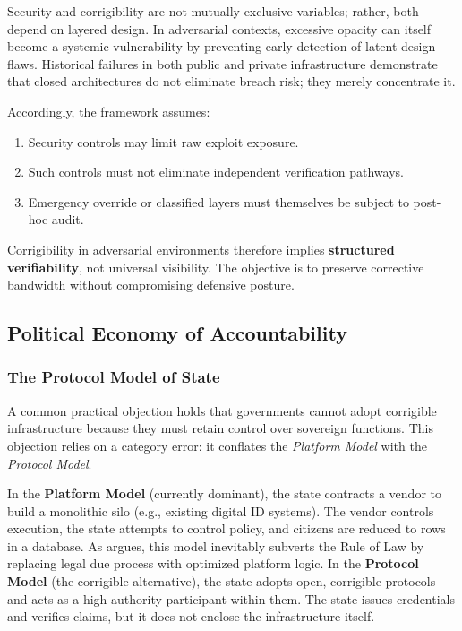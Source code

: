 \documentclass{article}
\begin{document}
Security and corrigibility are not mutually exclusive variables; rather, both depend on layered design. In adversarial contexts, excessive opacity can itself become a systemic vulnerability by preventing early detection of latent design flaws. Historical failures in both public and private infrastructure demonstrate that closed architectures do not eliminate breach risk; they merely concentrate it.

Accordingly, the framework assumes:
\begin{enumerate}[noitemsep]
    \item Security controls may limit raw exploit exposure.
    \item Such controls must not eliminate independent verification pathways.
    \item Emergency override or classified layers must themselves be subject to post-hoc audit.
\end{enumerate}

Corrigibility in adversarial environments therefore implies \textbf{structured verifiability}, not universal visibility. The objective is to preserve corrective bandwidth without compromising defensive posture.

\subsection{Political Economy of Accountability}
\label{subsec:political-economy-discussion}

\subsubsection{The Protocol Model of State}

A common practical objection holds that governments cannot adopt corrigible infrastructure because they must retain control over sovereign functions. This objection relies on a category error: it conflates the \textit{Platform Model} with the \textit{Protocol Model}.

In the \textbf{Platform Model} (currently dominant), the state contracts a vendor to build a monolithic silo (e.g., existing digital ID systems). The vendor controls execution, the state attempts to control policy, and citizens are reduced to rows in a database. As \citet{cohen2019} argues, this model inevitably subverts the Rule of Law by replacing legal due process with optimized platform logic. In the \textbf{Protocol Model} (the corrigible alternative), the state adopts open, corrigible protocols and acts as a high-authority participant within them. The state issues credentials and verifies claims, but it does not enclose the infrastructure itself.
\end{document}
